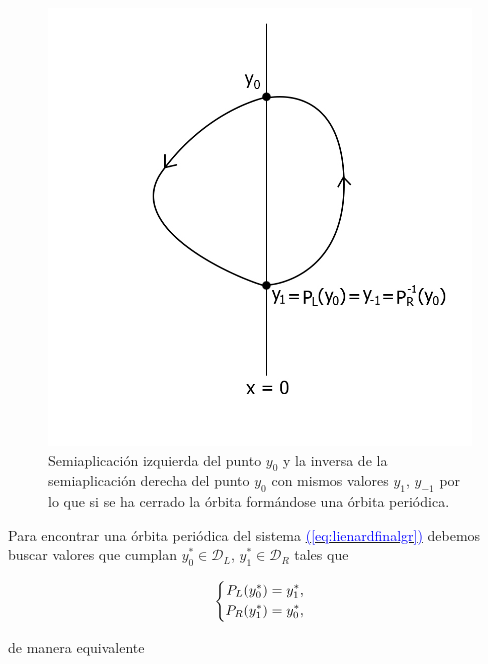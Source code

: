 \documentclass[12pt,a4paper]{report} %
\newcommand{\eref}[1]{\hyperref[#1]{\textcolor{blue}{(\ref*{#1})}}}
\begin{document}
	\begin{figure}[h]
		\centering
		\includegraphics[width=1.1\textwidth,center]{aplipoincareL-Rcerrado.jpg}
		\caption{Semiaplicación izquierda del punto $y_0$ y la inversa de la semiaplicación derecha del punto $y_0$ con mismos valores $y_1$, $y_{-1}$ por lo que si se ha cerrado la órbita formándose una órbita periódica.}
		\label{fig:aplipoincareL-Rcerrado}
	\end{figure}\smallskip
	
	\newpage
	
	\vspace{0.5cm}\noindent Para encontrar una órbita periódica del sistema \eref{eq:lienardfinalgr} debemos buscar valores que cumplan $y_0^*\in \mathcal{D}_L$, $y_1^*\in \mathcal{D}_R$ tales que
	
	\begin{equation*}
		\label{eq:ej1}
		\scalebox{1}{$\displaystyle
			\left\{
			\begin{aligned}
				P_L(y_0^*)=y_1^*, \\
				P_R(y_1^*)=y_0^* ,
			\end{aligned}
			\right. 
			$}
	\end{equation*}\smallskip
	
	\noindent de manera equivalente
	
\end{document}
